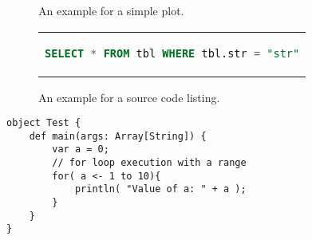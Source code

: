 \begin{figure}[htpb]
  \centering

  \exampleA
  \exampleB
  \caption[Example plot]{An example for a simple plot.}\label{fig:sample-plot}
\end{figure}

\begin{figure}[htpb]
  \centering
  \begin{tabular}{c}
  \begin{lstlisting}[language=SQL]
    SELECT * FROM tbl WHERE tbl.str = "str"
  \end{lstlisting}
  \end{tabular}
  \caption[Example listing]{An example for a source code listing.}\label{fig:sample-listing}
\end{figure}

\begin{minipage}[t]{\textwidth}
\begin{lstlisting}[style=scala, caption=Simple Listing example]
object Test {
    def main(args: Array[String]) {
        var a = 0;
        // for loop execution with a range
        for( a <- 1 to 10){
            println( "Value of a: " + a );
        }
    }
}
\end{lstlisting}
\label{overview}
\end{minipage}